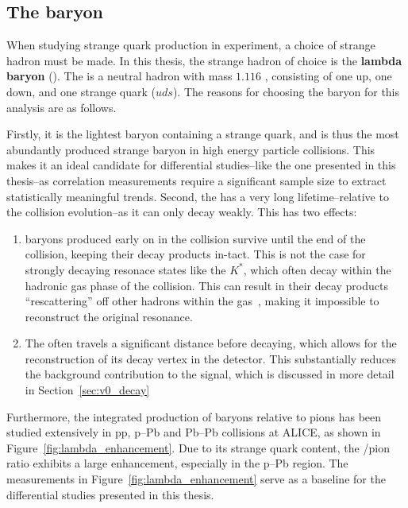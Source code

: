 \subsection{The \lmb baryon}
\label{sec:lambda_baryon}

When studying strange quark production in experiment, a choice of strange hadron must be made. In this thesis, the strange hadron of choice is the \textbf{lambda baryon} (\lmb). The \lmb is a neutral hadron with mass $1.116$ \GeVmass, consisting of one up, one down, and one strange quark ($uds$). The reasons for choosing the \lmb baryon for this analysis are as follows.

Firstly, it is the lightest baryon containing a strange quark, and is thus the most abundantly produced strange baryon in high energy particle collisions. This makes it an ideal candidate for differential studies--like the one presented in this thesis--as correlation measurements require a significant sample size to extract statistically meaningful trends. Second, the \lmb has a very long lifetime--relative to the collision evolution--as it can only decay weakly. This has two effects:
\begin{enumerate}
    \item \lmb baryons produced early on in the collision survive until the end of the collision, keeping their decay products in-tact. This is not the case for strongly decaying resonace states like the $K^*$, which often decay within the hadronic gas phase of the collision. This can result in their decay products ``rescattering'' off other hadrons within the gas~\cite{Rescatter}, making it impossible to reconstruct the original resonance.
    \item The \lmb often travels a significant distance before decaying, which allows for the reconstruction of its decay vertex in the detector. This substantially reduces the background contribution to the \lmb signal, which is discussed in more detail in Section~\ref{sec:v0_decay}
\end{enumerate}
Furthermore, the integrated production of \lmb baryons relative to pions has been studied extensively in pp, p--Pb and Pb--Pb collisions at ALICE, as shown in Figure~\ref{fig:lambda_enhancement}. Due to its strange quark content, the \lmb/pion ratio exhibits a large enhancement, especially in the p--Pb region. The measurements in Figure~\ref{fig:lambda_enhancement} serve as a baseline for the differential studies presented in this thesis.

